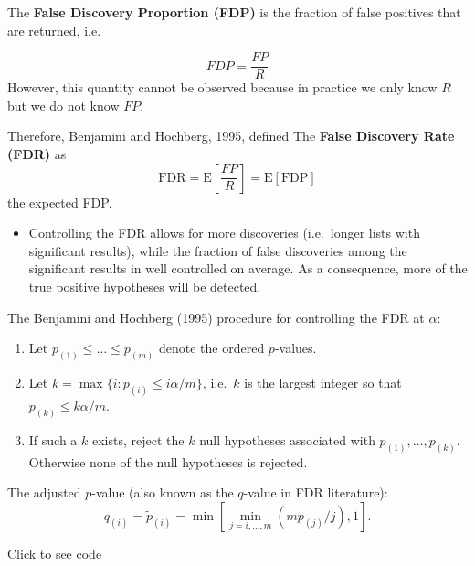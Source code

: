 \documentclass[
]{article}
\providecommand{\tightlist}{%
  \setlength{\itemsep}{0pt}\setlength{\parskip}{0pt}}
\begin{document}
The \textbf{False Discovery Proportion (FDP)} is the fraction of false
positives that are returned, i.e.~

\[
FDP = \frac{FP}{R}
\] However, this quantity cannot be observed because in practice we only
know \(R\) but we do not know \(FP\).

Therefore, Benjamini and Hochberg, 1995, defined The \textbf{False
Discovery Rate (FDR)} as \[
   \text{FDR} = \text{E}\left[\frac{FP}{R}\right] =\text{E}\left[\text{FDP}\right]
\] the expected FDP.

\begin{itemize}
\tightlist
\item
  Controlling the FDR allows for more discoveries (i.e.~longer lists
  with significant results), while the fraction of false discoveries
  among the significant results in well controlled on average. As a
  consequence, more of the true positive hypotheses will be detected.
\end{itemize}

The Benjamini and Hochberg (1995) procedure for controlling the FDR at
\(\alpha\):

\begin{enumerate}
\def\labelenumi{\arabic{enumi}.}
\item
  Let \(p_{(1)}\leq \ldots \leq p_{(m)}\) denote the ordered
  \(p\)-values.
\item
  Let \(k=\max\{i: p_{(i)}\leq i \alpha/m\}\), i.e.~\(k\) is the largest
  integer so that \(p_{(k)}\leq k \alpha/m\).
\item
  If such a \(k\) exists, reject the \(k\) null hypotheses associated
  with \(p_{(1)}, \ldots, p_{(k)}\). Otherwise none of the null
  hypotheses is rejected.
\end{enumerate}

The adjusted \(p\)-value (also known as the \(q\)-value in FDR
literature): \[
   q_{(i)}=\tilde{p}_{(i)} = \min\left[\min_{j=i,\ldots, m}\left(m p_{(j)}/j\right), 1 \right].
 \]

Click to see code
\end{document}
